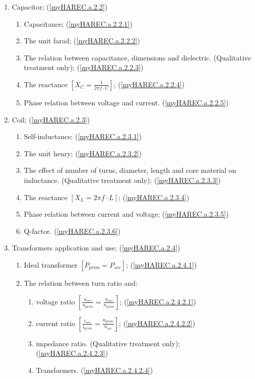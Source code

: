 \begin{enumerate}
\begin{enumerate}
\item Capacitor; (\ref{myHAREC.a.2.2})\label{HAREC.a.2.2}
\begin{enumerate}
\item Capacitance; (\ref{myHAREC.a.2.2.1})\label{HAREC.a.2.2.1}
\item The unit farad; (\ref{myHAREC.a.2.2.2})\label{HAREC.a.2.2.2}
\item The relation between capacitance, dimensions and dielectric.
  (Qualitative treatment only); (\ref{myHAREC.a.2.2.3})\label{HAREC.a.2.2.3}
\item The reactance \(\left[X_C = \frac{1}{2\pi f \cdot C}\right]\);
  (\ref{myHAREC.a.2.2.4})\label{HAREC.a.2.2.4}
\item Phase relation between voltage and current.
  (\ref{myHAREC.a.2.2.5})\label{HAREC.a.2.2.5}
\end{enumerate}

\item Coil; (\ref{myHAREC.a.2.3})\label{HAREC.a.2.3}
\begin{enumerate}
\item Self-inductance; (\ref{myHAREC.a.2.3.1})\label{HAREC.a.2.3.1}
\item The unit henry; (\ref{myHAREC.a.2.3.2})\label{HAREC.a.2.3.2}
\item The effect of number of turns, diameter, length and core material on
  inductance. (Qualitative treatment only);
  (\ref{myHAREC.a.2.3.3})\label{HAREC.a.2.3.3}
\item The reactance  \(\left[X_L = 2\pi f \cdot L\right]\);
  (\ref{myHAREC.a.2.3.4})\label{HAREC.a.2.3.4}
\item Phase relation between current and voltage;
  (\ref{myHAREC.a.2.3.5})\label{HAREC.a.2.3.5}
\item Q-factor. (\ref{myHAREC.a.2.3.6})\label{HAREC.a.2.3.6}
\end{enumerate}

\item Transformers application and use; (\ref{myHAREC.a.2.4})\label{HAREC.a.2.4}
\begin{enumerate}
\item Ideal transformer \(\left[P_{prim} = P_{sec}\right]\);
  (\ref{myHAREC.a.2.4.1})\label{HAREC.a.2.4.1}
\item The relation between turn ratio and:
\begin{enumerate}
\item voltage ratio
  \(\left[\frac{u_{sec}}{u_{prim}} = \frac{n_{sec}}{n_{prim}}\right]\);
  (\ref{myHAREC.a.2.4.2.1})\label{HAREC.a.2.4.2.1}
\item current ratio
  \(\left[\frac{i_{sec}}{i_{prim}} = \frac{n_{prim}}{n_{sec}}\right]\);
  (\ref{myHAREC.a.2.4.2.2})\label{HAREC.a.2.4.2.2}
\item impedance ratio. (Qualitative treatment only);
  (\ref{myHAREC.a.2.4.2.3})\label{HAREC.a.2.4.2.3}
\item Transformers. (\ref{myHAREC.a.2.4.2.4})\label{HAREC.a.2.4.2.4}
\end{enumerate}
\end{enumerate}


\end{enumerate}
\end{enumerate}

